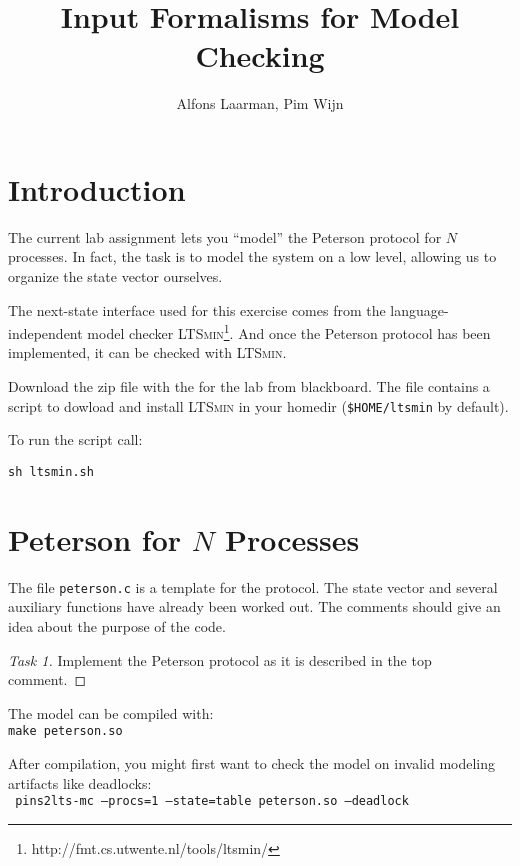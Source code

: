 \documentclass[12pt]{article}
\title{Input Formalisms for Model Checking}
\author{{Alfons Laarman, Pim Wijn}}
\def\ltsmin{\textsc{LTSmin}\xspace}
\begin{document}
\maketitle

\section{Introduction}

The current lab assignment lets you ``model'' the
Peterson protocol for $N$ processes. In fact, the task is
to model the system on a low level, allowing us to organize
the state vector ourselves.

The next-state interface used for this exercise comes from
the language-independent  model checker \ltsmin\footnote{http://fmt.cs.utwente.nl/tools/ltsmin/}. 
And once the Peterson protocol has been implemented,
it can be checked with \ltsmin.

Download the zip file with the for the lab from blackboard.
The file contains a script to dowload and 
install \ltsmin in your homedir
(\texttt{\$HOME/ltsmin} by default).

To run the script call:

\texttt{sh ltsmin.sh}


\section{Peterson for $N$ Processes}

The file \texttt{peterson.c} is a template for
the protocol. The state vector and several
auxiliary functions have already been worked out.
The comments should give an idea about the purpose of
the code. 

\begin{proof}[Task 1]
Implement the Peterson protocol as it is described in the top comment.
\end{proof}

The model can be compiled with:\\
{\footnotesize
\texttt{make peterson.so}}



After compilation, you might first want to check the model on invalid modeling artifacts like deadlocks:\\
{\footnotesize
\texttt{
pins2lts-mc --procs=1 --state=table peterson.so
--deadlock
}}
\end{document}
